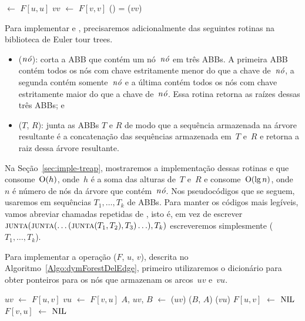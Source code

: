 \begin{algorithm}[htb]
\caption{\dymForestQuery($F$, $u$, $v$)}
\label{Algo:dymForestQuery}
\begin{algorithmic}[1]
\State {} $\gets$ $F[u,u]$
\State $vv$ $\gets$ $F[v,v]$
\State \Return \treapGetRoot() = \treapGetRoot($vv$)
\end{algorithmic}
\end{algorithm}

Para implementar \dymForestAddEdge{} e \dymForestDelEdge{}, precisaremos adicionalmente das seguintes rotinas na biblioteca de Euler tour trees. 
\begin{itemize}
\item \treapSplit($\mathit{n\acute{o}}$): corta a ABB que contém um nó~$\mathit{n\acute{o}}$ em três ABBs. A primeira ABB contém todos os nós com chave estritamente menor do que a chave de~$\mathit{n\acute{o}}$, a segunda contém somente~$\mathit{n\acute{o}}$ e a última contém todos os nós com chave estritamente maior do que a chave de~$\mathit{n\acute{o}}$. Essa rotina retorna as raízes dessas três ABBs; e
\item \treapJoin($T$, $R$): junta as ABBs $T$ e $R$ de modo que a sequência armazenada na árvore resultante é a concatenação das sequências armazenada em~$T$ e~$R$ e retorna a raiz dessa árvore resultante.
\end{itemize}

Na Seção~\ref{sec:imple-treap}, mostraremos a implementação dessas rotinas e que~\treapJoin{} consome~$\mathrm{O}(h)$, onde~$h$ é a soma das alturas de~$T$ e~$R$ e \treapSplit{} consome~$\mathrm{O}(\lg n)$, onde~$n$ é número de nós da árvore que contém~$\mathit{n\acute{o}}$.
Nos pseudocódigos que se seguem, usaremos \treapJoin{} em sequências $T_1,\ldots, T_k$ de ABBs.
Para manter os códigos mais legíveis, vamos abreviar chamadas repetidas de \treapJoin{}, isto é, em vez de escrever~$\text{\scshape junta}(\text{\scshape junta}(\ldots(\text{\scshape junta}(T_1,T_2),T_3)\ldots),T_k)$ escreveremos simplesmente \treapJoin($T_1,\ldots, T_k$).

Para implementar a operação \dymForestDelEdge($F$, $u$, $v$), descrita no Algoritmo~\ref{Algo:dymForestDelEdge}, 
primeiro utilizaremos o dicionário para obter ponteiros para os nós que armazenam os arcos~$uv$ e~$vu$.

\begin{algorithm}[htb]
\caption{\dymForestDelEdge($F$, $u$, $v$)}
\label{Algo:dymForestDelEdge}
\begin{algorithmic}[1]
\State $uv$ $\gets$ $F[u,v]$\label{Algo:dymForestDelEdge:1}
\State $vu$ $\gets$ $F[v,u]$\label{Algo:dymForestDelEdge:2}
\State $A$, $uv$, $B$ $\gets$ \treapSplit($uv$)\label{Algo:dymForestDelEdge:3}
\State \treapJoin($B$, $A$)\label{Algo:dymForestDelEdge:4}
\State \treapSplit($vu$)\label{Algo:dymForestDelEdge:5}
\State $F[u,v]$ $\gets$ $\text{NIL}{}$\label{Algo:dymForestDelEdge:6}
\State $F[v,u]$ $\gets$ $\text{NIL}{}$\label{Algo:dymForestDelEdge:7}
\end{algorithmic}
\end{algorithm}

